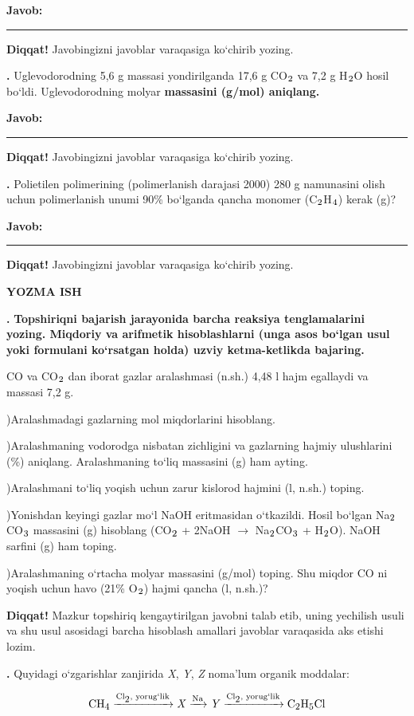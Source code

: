 \documentclass[11pt,a4paper]{article}
\renewcommand{\textsubscript}[1]{\ensuremath{_{\text{\fontsize{8}{8}\selectfont #1}}}}
\newcommand{\qn}[1]{\textbf{\fontsize{11.5}{13}\selectfont #1}}
\newcommand{\qsep}{\par\vspace{1pt}\noindent\rule{0pt}{0.4pt}\par\vspace{5pt}}
\newcommand{\diqqat}[1]{\par\smallskip\noindent\textbf{Diqqat!} #1\par\medskip}
\newcommand{\javob}{\par\smallskip\noindent\textbf{Javob:} \rule[-2pt]{7.5cm}{0.4pt}\par\smallskip\noindent\textbf{Diqqat!} Javobingizni javoblar varaqasiga ko`chirib yozing.\par\medskip}
\begin{document}
\javob\qsep
\noindent\qn{39.} Uglevodorodning 5,6 g massasi yondirilganda 17,6 g CO\textsubscript{2} va 7,2 g H\textsubscript{2}O hosil bo`ldi. Uglevodorodning molyar \textbf{massasini (g/mol) aniqlang.}
\javob\qsep
\noindent\qn{40.} Polietilen polimerining (polimerlanish darajasi 2000) 280 g namunasini olish uchun polimerlanish unumi 90\% bo`lganda qancha monomer (C\textsubscript{2}H\textsubscript{4}) kerak (g)?
\javob\qsep
\par\bigskip\begin{center}\textbf{\fontsize{13}{15}\selectfont YOZMA ISH}\end{center}
\noindent\qn{41.} \textbf{Topshiriqni bajarish jarayonida barcha reaksiya tenglamalarini yozing. Miqdoriy va arifmetik hisoblashlarni (unga asos bo`lgan usul yoki formulani ko`rsatgan holda) uzviy ketma-ketlikda bajaring.}\par\smallskip
CO va CO\textsubscript{2} dan iborat gazlar aralashmasi (n.sh.) 4,48 l hajm egallaydi va massasi 7,2 g.\par
{})Aralashmadagi gazlarning mol miqdorlarini hisoblang.\par
{})Aralashmaning vodorodga nisbatan zichligini va gazlarning hajmiy ulushlarini (\%) aniqlang. Aralashmaning to`liq massasini (g) ham ayting.\par
{})Aralashmani to`liq yoqish uchun zarur kislorod hajmini (l, n.sh.) toping.\par
{})Yonishdan keyingi gazlar mo`l NaOH eritmasidan o`tkazildi. Hosil bo`lgan Na\textsubscript{2}CO\textsubscript{3} massasini (g) hisoblang (CO\textsubscript{2} + 2NaOH $\to$ Na\textsubscript{2}CO\textsubscript{3} + H\textsubscript{2}O). NaOH sarfini (g) ham toping.\par
{})Aralashmaning o`rtacha molyar massasini (g/mol) toping. Shu miqdor CO ni yoqish uchun havo (21\% O\textsubscript{2}) hajmi qancha (l, n.sh.)?\par
\diqqat{Mazkur topshiriq kengaytirilgan javobni talab etib, uning yechilish usuli va shu usul asosidagi barcha hisoblash amallari javoblar varaqasida aks etishi lozim.}\qsep
\noindent\qn{42.} Quyidagi o`zgarishlar zanjirida \textit{X}, \textit{Y}, \textit{Z} noma'lum organik moddalar:\par
\[\setlength{\fboxsep}{0pt}\text{CH\textsubscript{4}}\xrightarrow{\text{Cl\textsubscript{2}, yorug`lik}}\text{\textit{X}}\xrightarrow{\text{Na}}\text{\textit{Y}}\xrightarrow{\text{Cl\textsubscript{2}, yorug`lik}}\text{C\textsubscript{2}H\textsubscript{5}Cl}\]
\end{document}
